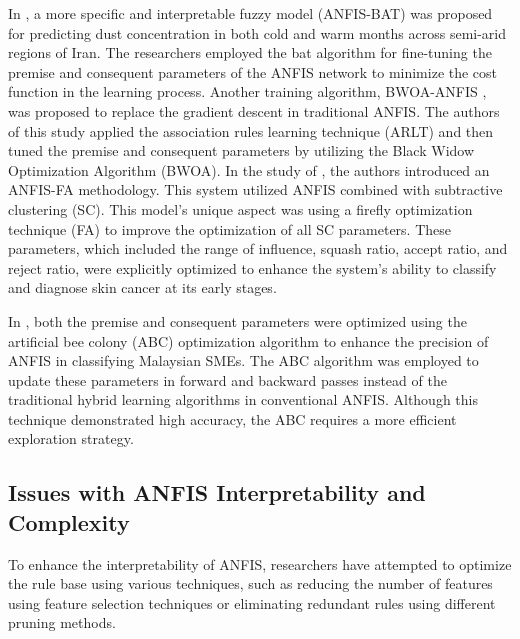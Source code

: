 In \cite{ebrahimi2021accuracy}, a more specific and interpretable fuzzy model (ANFIS-BAT) was proposed for predicting dust concentration in both cold and warm months across semi-arid regions of Iran. The researchers employed the bat algorithm for fine-tuning the premise and consequent parameters of the ANFIS network to minimize the cost function in the learning process. Another training algorithm, BWOA-ANFIS \cite{tightiz2020intelligent}, was proposed to replace the gradient descent in traditional ANFIS. The authors of this study applied the association rules learning technique (ARLT) and then tuned the premise and consequent parameters by utilizing the Black Widow Optimization Algorithm (BWOA).
In the study of  \cite{rajeshwari2022dermatology}, the authors introduced an ANFIS-FA methodology. This system utilized ANFIS  combined with subtractive clustering (SC). This model's unique aspect was using a firefly optimization technique (FA) to improve the optimization of all SC parameters. These parameters, which included the range of influence, squash ratio, accept ratio, and reject ratio, were explicitly optimized to enhance the system's ability to classify and diagnose skin cancer at its early stages.

In \cite{salleh2017optimization}, both the premise and consequent parameters were optimized using the artificial bee colony (ABC) optimization algorithm to enhance the precision of ANFIS in classifying Malaysian SMEs. The ABC algorithm was employed to update these parameters in forward and backward passes instead of the traditional hybrid learning algorithms in conventional ANFIS. Although this technique demonstrated high accuracy, the ABC requires a more efficient exploration strategy.

\subsection{Issues with ANFIS Interpretability and Complexity}\label{related2}

To enhance the interpretability of ANFIS, researchers have attempted to optimize the rule base using various techniques, such as reducing the number of features using feature selection techniques or eliminating redundant rules using different pruning methods.

